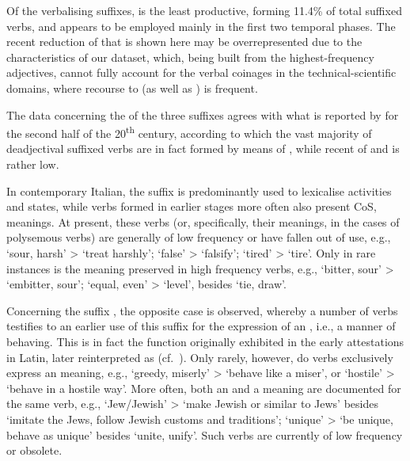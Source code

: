 \documentclass[output=paper,colorlinks,citecolor=brown]{langscibook}
\begin{document}
Of the verbalising suffixes,  is the least productive, forming 11.4\% of total suffixed verbs, and appears to be employed mainly in the first two temporal phases. The recent reduction of  that is shown here may be overrepresented due to the characteristics of our dataset, which, being built from the highest-frequency adjectives, cannot fully account for the verbal coinages in the technical-scientific domains, where recourse to  (as well as ) is frequent.

The data concerning the  of the three suffixes agrees with what is reported by \citet{Grossmann2004} for the second half of the 20\textsuperscript{th} century, according to which the vast majority of deadjectival suffixed verbs  are in fact formed by means of , while recent  of  and  is rather low.

In contemporary Italian, the suffix  is predominantly used to lexicalise activities and states, while verbs formed in earlier stages more often also present CoS,  meanings. At present, these verbs (or, specifically, their  meanings, in the cases of polysemous verbs) are generally of low frequency or have fallen out of use, e.g.,  ‘sour, harsh’ >  ‘treat harshly’;  ‘false’ >  ‘falsify’;  ‘tired’ >  ‘tire’. Only in rare instances is the  meaning preserved in high frequency verbs, e.g.,  ‘bitter, sour’ >  ‘embitter, sour’;  ‘equal, even’ >  ‘level’, besides ‘tie, draw’.

Concerning the suffix , the opposite case is observed, whereby a number of verbs testifies to an earlier use of this suffix for the expression of an , i.e., a manner of behaving. This is in fact the function originally exhibited in the early attestations in Latin, later reinterpreted as  (cf.\  \citealt{GibertSoteloPujolPayet2020}). Only rarely, however, do  verbs exclusively express an  meaning, e.g.,  ‘greedy, miserly’ >  ‘behave like a miser’, or  ‘hostile’ >  ‘behave in a hostile way’. More often, both an  and a  meaning are documented for the same verb, e.g.,  ‘Jew/Jewish’ >  ‘make Jewish or similar to Jews’ besides ‘imitate the Jews, follow Jewish customs and traditions’;  ‘unique’ >  ‘be unique, behave as unique’ besides ‘unite, unify’. Such verbs are currently of low frequency or obsolete.
\end{document}
